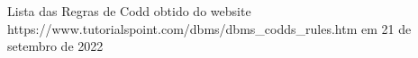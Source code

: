\documentclass[
12pt,		%
openright,	%
twoside,  %
a4paper,			%
chapter=TITLE,		%
english,			%
french,				%
spanish,			%
brazil				%
]{USPSC-classe/USPSC}
\begin{document}
\begin{flushleft}
\begin{flushleft}
\begin{flushleft}
\begin{flushleft}
\begin{flushleft}
\begin{flushleft}
\begin{flushleft}
\begin{flushleft}
\begin{flushleft}
\begin{flushleft}
\begin{flushleft}
\begin{flushleft}
\begin{flushleft}
\begin{flushleft}
[TutorialsPoint, 2022] Lista das Regras de Codd obtido do website https://www.tutorialspoint.com/dbms/dbms\_codds\_rules.htm em 21 de setembro de 2022
\end{flushleft}


\end{flushleft}


\end{flushleft}


\end{flushleft}


\end{flushleft}


\end{flushleft}


\end{flushleft}


\end{flushleft}


\end{flushleft}


\end{flushleft}


\end{flushleft}


\end{flushleft}


\end{flushleft}


\end{flushleft}
\end{document}
